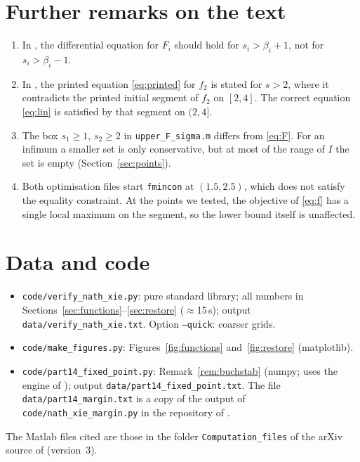 \documentclass[11pt,a4paper]{amsart}
\theoremstyle{remark}
\numberwithin{equation}{section}
\begin{document}
\section{Further remarks on the text}\label{sec:minor}
\begin{enumerate}
\item In \cite[Lemma~3.6]{NX}, the differential equation for $F_i$ should hold for $s_i>\beta_i+1$, not for
$s_i>\beta_i-1$.
\item In \cite[\S5]{NX}, the printed equation \eqref{eq:printed} for $f_2$ is stated for $s>2$, where it contradicts
the printed initial segment of $f_2$ on $[2,4]$. The correct equation \eqref{eq:lin} is satisfied by that segment
on $(2,4]$.
\item The box $s_1\ge1$, $s_2\ge2$ in \texttt{upper\_F\_sigma.m} differs from \eqref{eq:F}. For an infimum a smaller
set is only conservative, but at most of the range of $I$ the set is empty (Section~\ref{sec:points}).
\item Both optimisation files start \texttt{fmincon} at $(1.5,2.5)$, which does not satisfy the equality
constraint. At the points we tested, the objective of \eqref{eq:f} has a single local maximum on the segment, so
the lower bound itself is unaffected.
\end{enumerate}

\section*{Data and code}
\begin{itemize}
\item \texttt{code/verify\_nath\_xie.py}: pure standard library; all numbers in Sections~\ref{sec:functions}--\ref{sec:restore}
($\approx$15\,s); output \texttt{data/verify\_nath\_xie.txt}. Option \texttt{--quick}: coarser grids.
\item \texttt{code/make\_figures.py}: Figures~\ref{fig:functions} and~\ref{fig:restore} (matplotlib).
\item \texttt{code/part14\_fixed\_point.py}: Remark~\ref{rem:buchstab} (numpy; uses the engine of \cite{ChenXIV}); output
\texttt{data/part14\_fixed\_point.txt}. The file \texttt{data/part14\_margin.txt} is a copy of the output of
\texttt{code/nath\_xie\_margin.py} in the repository of \cite{ChenXIV}.
\end{itemize}
The Matlab files cited are those in the folder \texttt{Computation\_files} of the arXiv source of \cite{NX} (version~3).
\end{document}
